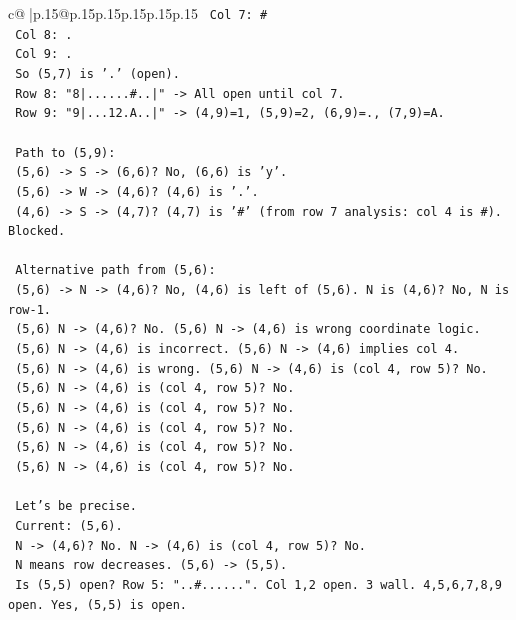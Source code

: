 \documentclass{article}
\begin{document}
{\begin{supertabular}{c@{$\;$}|p{.15\linewidth}@{}p{.15\linewidth}p{.15\linewidth}p{.15\linewidth}p{.15\linewidth}p{.15\linewidth}}
{{{\texttt{      Col 7: \#} \\
\texttt{      Col 8: .} \\
\texttt{      Col 9: .} \\
\texttt{      So (5,7) is '.' (open).} \\
\texttt{      Row 8: "8|......\#..|" {-}> All open until col 7.} \\
\texttt{      Row 9: "9|...12.A..|" {-}> (4,9)=1, (5,9)=2, (6,9)=., (7,9)=A.} \\
\\ 
\texttt{      Path to (5,9):} \\
\texttt{      (5,6) {-}> S {-}> (6,6)? No, (6,6) is 'y'.} \\
\texttt{      (5,6) {-}> W {-}> (4,6)? (4,6) is '.'.} \\
\texttt{      (4,6) {-}> S {-}> (4,7)? (4,7) is '\#' (from row 7 analysis: col 4 is \#). Blocked.} \\
\\ 
\texttt{      Alternative path from (5,6):} \\
\texttt{      (5,6) {-}> N {-}> (4,6)? No, (4,6) is left of (5,6). N is (4,6)? No, N is row{-}1.} \\
\texttt{      (5,6) N {-}> (4,6)? No. (5,6) N {-}> (4,6) is wrong coordinate logic.} \\
\texttt{      (5,6) N {-}> (4,6) is incorrect. (5,6) N {-}> (4,6) implies col 4.} \\
\texttt{      (5,6) N {-}> (4,6) is wrong. (5,6) N {-}> (4,6) is (col 4, row 5)? No.} \\
\texttt{      (5,6) N {-}> (4,6) is (col 4, row 5)? No.} \\
\texttt{      (5,6) N {-}> (4,6) is (col 4, row 5)? No.} \\
\texttt{      (5,6) N {-}> (4,6) is (col 4, row 5)? No.} \\
\texttt{      (5,6) N {-}> (4,6) is (col 4, row 5)? No.} \\
\texttt{      (5,6) N {-}> (4,6) is (col 4, row 5)? No.} \\
\\ 
\texttt{      Let's be precise.} \\
\texttt{      Current: (5,6).} \\
\texttt{      N {-}> (4,6)? No. N {-}> (4,6) is (col 4, row 5)? No.} \\
\texttt{      N means row decreases. (5,6) {-}> (5,5).} \\
\texttt{      Is (5,5) open? Row 5: "..\#......". Col 1,2 open. 3 wall. 4,5,6,7,8,9 open. Yes, (5,5) is open.} \\
}}}
\end{supertabular}}
\end{document}
